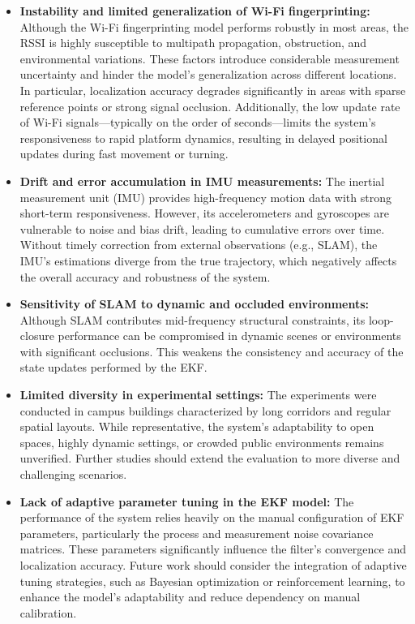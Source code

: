 \documentclass[12pt,a4paper]{article}
\numberwithin{equation}{section}
\begin{document}
\begin{itemize}
    \item \textbf{Instability and limited generalization of Wi-Fi fingerprinting:} Although the Wi-Fi fingerprinting model performs robustly in most areas, the RSSI is highly susceptible to multipath propagation, obstruction, and environmental variations. These factors introduce considerable measurement uncertainty and hinder the model’s generalization across different locations. In particular, localization accuracy degrades significantly in areas with sparse reference points or strong signal occlusion. Additionally, the low update rate of Wi-Fi signals—typically on the order of seconds—limits the system’s responsiveness to rapid platform dynamics, resulting in delayed positional updates during fast movement or turning.

    \item \textbf{Drift and error accumulation in IMU measurements:} The inertial measurement unit (IMU) provides high-frequency motion data with strong short-term responsiveness. However, its accelerometers and gyroscopes are vulnerable to noise and bias drift, leading to cumulative errors over time. Without timely correction from external observations (e.g., SLAM), the IMU’s estimations diverge from the true trajectory, which negatively affects the overall accuracy and robustness of the system.

    \item \textbf{Sensitivity of SLAM to dynamic and occluded environments:} Although SLAM contributes mid-frequency structural constraints, its loop-closure performance can be compromised in dynamic scenes or environments with significant occlusions. This weakens the consistency and accuracy of the state updates performed by the EKF.

    \item \textbf{Limited diversity in experimental settings:} The experiments were conducted in campus buildings characterized by long corridors and regular spatial layouts. While representative, the system’s adaptability to open spaces, highly dynamic settings, or crowded public environments remains unverified. Further studies should extend the evaluation to more diverse and challenging scenarios.

    \item \textbf{Lack of adaptive parameter tuning in the EKF model:} The performance of the system relies heavily on the manual configuration of EKF parameters, particularly the process and measurement noise covariance matrices. These parameters significantly influence the filter’s convergence and localization accuracy. Future work should consider the integration of adaptive tuning strategies, such as Bayesian optimization or reinforcement learning, to enhance the model’s adaptability and reduce dependency on manual calibration.
\end{itemize}
\end{document}
